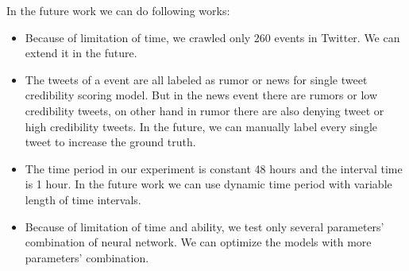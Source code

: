  In the future work we can do following works:
  \begin{itemize}
   \item Because of limitation of time, we crawled only 260 events in Twitter. We can extend it in the future. 
	

 \item The tweets of a event are all labeled as rumor or news for single tweet credibility scoring model. But in the news event there are rumors or low credibility tweets, on other hand in rumor there are also denying tweet or high credibility tweets. In the future, we can manually label every single tweet to increase the ground truth. 
 \item The time period in our experiment is constant 48 hours and the interval time is 1 hour. In the future work we can use dynamic time period with variable length of time intervals.
  \item Because of limitation of time and ability, we test only several parameters' combination of neural network. We can optimize the models with more parameters' combination.
  \end{itemize}


